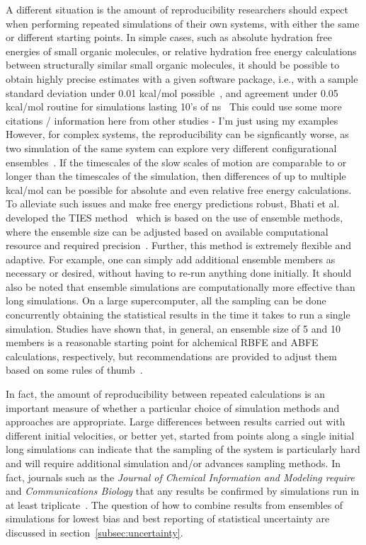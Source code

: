 \documentclass[9pt,bestpractices]{livecoms}
\begin{document}
A different situation is the amount of reproducibility researchers should expect when performing repeated simulations of their own systems, with either the same or different starting points. In simple cases, such as absolute hydration free energies of small organic molecules, or relative hydration free energy calculations between structurally similar small organic molecules, it should be possible to obtain highly precise estimates with a given software package, i.e., with a sample standard deviation under 0.01 kcal/mol possible~\cite{rizzi2019sampl6}, and agreement under 0.05 kcal/mol routine for simulations lasting 10's of ns~\cite{paliwal2011benchmark} {\color{red}This could use some more citations / information here from other studies - I'm just using my examples} However, for complex systems, the reproducibility can be signficantly worse, as two simulation of the same system can explore very different configurational ensembles~\cite{bhati2017, bhati2018, bhati2019, bhati2022, bhati2023, bhati2025}.  If the timescales of the slow scales of motion are comparable to or longer than the timescales of the simulation, then differences of up to multiple kcal/mol can be possible for absolute and even relative free energy calculations. To alleviate such issues and make free energy predictions robust, Bhati et al. developed the TIES method~\cite{bhati2017, bhati2022, bhati2025} which is based on the use of ensemble methods, where the ensemble size can be adjusted based on available computational resource and required precision~\cite{wan2023}. Further, this method is extremely flexible and adaptive. For example, one can simply add additional ensemble members as necessary or desired, without having to re-run anything done initially. It should also be noted that ensemble simulations are computationally more effective than long simulations. On a large supercomputer, all the sampling can be done concurrently obtaining the statistical results in the time it takes to run a single simulation. Studies have shown that, in general, an ensemble size of 5 and 10 members is a reasonable starting point for alchemical RBFE and ABFE calculations, respectively, but recommendations are provided to adjust them based on some rules of thumb~\cite{bhati2022, bhati2025}.

In fact, the amount of reproducibility between repeated calculations is an important measure of whether a particular choice of simulation methods and approaches are appropriate.  Large differences between results carried out with different initial velocities, or better yet, started from points along a single initial long simulations can indicate that the sampling of the system is particularly hard and will require additional simulation and/or advances sampling methods.  In fact, journals such as the \textit{Journal of Chemical Information and Modeling require} and \textit{Communications Biology} that any results be confirmed by simulations run in at least triplicate~\cite{soares2023guidelines, wan2023}. The question of how to combine results from ensembles of simulations for lowest bias and best reporting of statistical uncertainty are discussed in section~\ref{subsec:uncertainty}.
\end{document}
